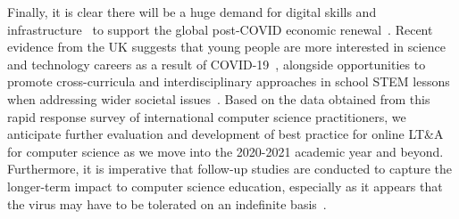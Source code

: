 \documentclass[conference]{IEEEtran}
\begin{document}
Finally, it is clear there will be a huge demand for digital skills
and
infrastructure~\cite{tryfonas+crick:petra2018,davenport-et-al:educon2020,baker:2020}
to support the global post-COVID economic
renewal~\cite{nadellaft:2020}. Recent evidence from the UK suggests
that young people are more interested in science and technology
careers as a result of COVID-19~\cite{bsasciecareers:2020}, alongside
opportunities to promote cross-curricula and interdisciplinary
approaches in school STEM lessons when addressing wider societal
issues~\cite{reiss:2020}. Based on the data obtained from this rapid
response survey of international computer science practitioners, we
anticipate further evaluation and development of best practice for
online LT\&A for computer science as we move into the 2020-2021
academic year and beyond. Furthermore, it is imperative that follow-up
studies are conducted to capture the longer-term impact to computer
science education, especially as it appears that the virus may have to
be tolerated on an indefinite basis~\cite{kissler-et-al:2020}.





 
\end{document}
